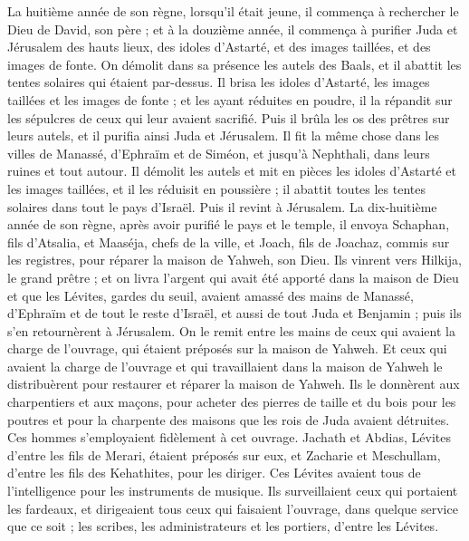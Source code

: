\begin{multicols}{2}
La huitième année de son règne, lorsqu'il était jeune, il commença à rechercher le Dieu de David, son père ; et à la douzième année, il commença à purifier Juda et Jérusalem des hauts lieux, des idoles d'Astarté, et des images taillées, et des images de fonte.
On démolit dans sa présence les autels des Baals, et il abattit les tentes solaires qui étaient par-dessus. Il brisa les idoles d'Astarté, les images taillées et les images de fonte ; et les ayant réduites en poudre, il la répandit sur les sépulcres de ceux qui leur avaient sacrifié.
Puis il brûla les os des prêtres sur leurs autels, et il purifia ainsi Juda et Jérusalem.
Il fit la même chose dans les villes de Manassé, d'Ephraïm et de Siméon, et jusqu'à Nephthali, dans leurs ruines et tout autour.
Il démolit les autels et mit en pièces les idoles d'Astarté et les images taillées, et il les réduisit en poussière ; il abattit toutes les tentes solaires dans tout le pays d'Israël. Puis il revint à Jérusalem.
La dix-huitième année de son règne, après avoir purifié le pays et le temple, il envoya Schaphan, fils d'Atsalia, et Maaséja, chefs de la ville, et Joach, fils de Joachaz, commis sur les registres, pour réparer la maison de Yahweh, son Dieu.
Ils vinrent vers Hilkija, le grand prêtre ; et on livra l'argent qui avait été apporté dans la maison de Dieu et que les Lévites, gardes du seuil, avaient amassé des mains de Manassé, d'Ephraïm et de tout le reste d'Israël, et aussi de tout Juda et Benjamin ; puis ils s'en retournèrent à Jérusalem.
On le remit entre les mains de ceux qui avaient la charge de l'ouvrage, qui étaient préposés sur la maison de Yahweh. Et ceux qui avaient la charge de l'ouvrage et qui travaillaient dans la maison de Yahweh le distribuèrent pour restaurer et réparer la maison de Yahweh.
Ils le donnèrent aux charpentiers et aux maçons, pour acheter des pierres de taille et du bois pour les poutres et pour la charpente des maisons que les rois de Juda avaient détruites.
Ces hommes s'employaient fidèlement à cet ouvrage. Jachath et Abdias, Lévites d'entre les fils de Merari, étaient préposés sur eux, et Zacharie et Meschullam, d'entre les fils des Kehathites, pour les diriger. Ces Lévites avaient tous de l'intelligence pour les instruments de musique.
Ils surveillaient ceux qui portaient les fardeaux, et dirigeaient tous ceux qui faisaient l'ouvrage, dans quelque service que ce soit ; les scribes, les administrateurs et les portiers, d'entre les Lévites.

\end{multicols}

